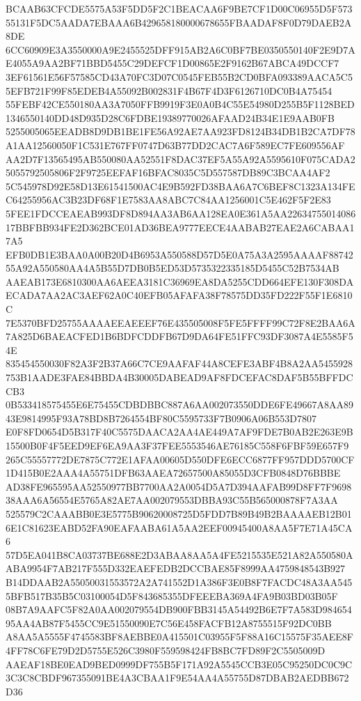 \documentclass[UTF8,fontset=fandol,zihao=-4,a4paper]{ctexart}
\begin{document}
{{BCAAB63CFCDE5575A53F5DD5F2C1BEACAA6F9BE7CF1D00C06955D5F57355131F5DC5AADA7EBAAA6B429658180000678655FBAADAF8F0D79DAEB2A8DE
6CC60909E3A3550000A9E2455525DFF915AB2A6C0BF7BE0350550140F2E9D7AE4055A9AA2BF71BBD5455C29DEFCF1D00865E2F9162B67ABCA49DCCF7
3EF61561E56F57585CD43A70FC3D07C0545FEB55B2CD0BFA093389AACA5C55EFB721F99F85EDEB4A55092B002831F4B67F4D3F6126710DC0B4A75454
55FEBF42CE550180AA3A7050FFB9919F3E0A0B4C55E54980D255B5F1128BED1346550140DD48D935D28C6FDBE19389770026AFAAD24B34E1E9AAB0FB
5255005065EEADB8D9DB1BE1FE56A92AE7AA923FD8124B34DB1B2CA7DF78A1AA12560050F1C531E767FF0747D63B77DD2CAC7A6F589EC7FE609556AF
AA2D7F13565495AB550080AA52551F8DAC37EF5A55A92A5595610F075CADA25055792505806F2F9725EEFAF16BFAC8035C5D557587DB89C3BCAA4AF2
5C545978D92E58D13E61541500AC4E9B592FD38BAA6A7C6BEF8C1323A134FEC64255956AC3B23DF68F1E7583AA8ABC7C84AA1256001C5E462F5F2E83
5FEE1FDCCEAEAB993DF8D894AA3AB6AA128EA0E361A5AA2263475501408617BBFBB934FE2D362BCE01AD36BEA9777EECE4AABAB27EAE2A6CABAA17A5
EFB0DB1E3BAA0A00B20D4B6953A550588D57D5E0A75A3A2595AAAAF8874255A92A550580AA4A5B55D7DB0B5ED53D5735322335185D5455C52B7534AB
AAEAB173E6810300AA6AEEA3181C36969EA8DA5255CDD664EFE130F308DAECADA7AA2AC3AEF62A0C40EFB05AFAFA38F78575DD35FD222F55F1E6810C
7E5370BFD25755AAAAEEAEEEF76E435505008F5FE5FFFF99C72F8E2BAA6A7A825D6BAEACFED1B6BDFCDDFB67D9DA64FE51FFC93DF3087A4E5585F54E
835454550030F82A3F2B37A66C7CE9AAFAF44A8CEFE3ABF4B8A2AA5455928753B1AADE3FAE84BBDA4B30005DABEAD9AF8FDCEFAC8DAF5B55BFFDCCB3
0B533418575455E6E75455CDBDBBC887A6AA002073550DDE6FE49667A8AA8943E9814995F93A78BD8B7264554BF80C5595733F7B0906A06B553D7807
E0F8FD0654D5B317F40C5575DAACA2AA4AE449A7AF9FDE7B0AB2E263E9B15500B0F4F5EED9EF6EA9AA3F37FEE5553546AE76185C558F6FBF59E657F9
265C55557772DE7875C772E1AFAA00605D550DFE6ECC6877FF957DDD5700CF1D415B0E2AAA4A55751DFB63AAEA72657500A85055D3CFB0848D76BBBE
AD38FE965595AA52550977BB7700AA2A0054D5A7D394AAFAB99D8FF7F969838AAA6A56554E5765A82AE7AA002079553DBBA93C55B565000878F7A3AA
525579C2CAAABB0E3E5775B90620008725D5FDD7B89B49B2BAAAAEB12B016E1C81623EABD52FA90EAFAABA61A5AA2EEF00945400A8AA5F7E71A45CA6
57D5EA041B8CA03737BE688E2D3ABAA8AA5A4FE5215535E521A82A550580AABA9954F7AB217F555D332EAEFEDB2DCCBAE85F8999AA4759848543B927
B14DDAAB2A55050031553572A2A741552D1A386F3E0B8F7FACDC48A3AA5455BFB517B35B5C03100054D5F843685355DFEEEBA369A4FA9B03BD03B05F
08B7A9AAFC5F82A0AA002079554DB900FBB3145A54492B6E7F7A583D98465495AA4AB87F5455CC9E51550090E7C56E458FACFB12A8755515F92DC0BB
A8AA5A5555F4745583BF8AEBBE0A415501C03955F5F88A16C15575F35AEE8F4FF78C6FE79D2D5755E526C3980F559598424FB8BC7FD89F2C5505009D
AAEAF18BE0EAD9BED0999DF755B5F171A92A5545CCB3E05C95250DC0C9C3C3C8CBDF967355091BE4A3CBAA1F9E54AA4A55755D87DBAB2AEDBB672D36
}}
\end{document}
